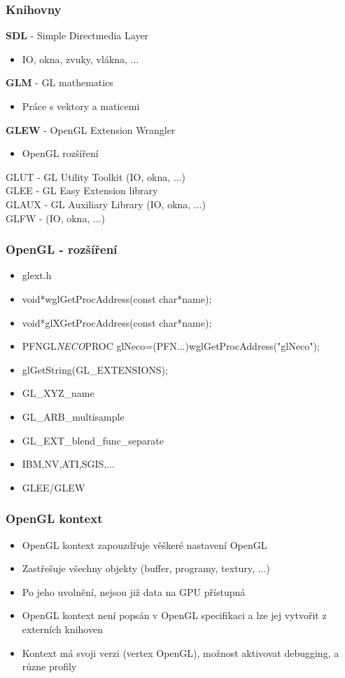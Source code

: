 

\begin{frame}
\frametitle{Knihovny}
  \textbf{SDL} - Simple Directmedia Layer
  \begin{itemize}
    \item IO, okna, zvuky, vlákna, ...
  \end{itemize}
  \textbf{GLM} - GL mathematics
  \begin{itemize}
    \item Práce s vektory a maticemi
  \end{itemize}
  \textbf{GLEW} - OpenGL Extension Wrangler
  \begin{itemize}
    \item OpenGL rozšíření
  \end{itemize}
  GLUT - GL Utility Toolkit (IO, okna, ...)\\
  GLEE - GL Easy Extension library\\
  GLAUX - GL Auxiliary Library (IO, okna, ...)\\
  GLFW - (IO, okna, ...)
\end{frame}

\begin{frame}
\frametitle{OpenGL - rozšíření}
  \begin{itemize}
    \item{glext.h}
    \item{void*wglGetProcAddress(const char*name);}
    \item{void*glXGetProcAddress(const char*name);}
    \item{PFNGL{\it NECO}PROC glNeco=(PFN...)wglGetProcAddress("glNeco");}
    \item{glGetString(GL\_EXTENSIONS);}
    \item{GL\_XYZ\_name}
    \item{GL\_ARB\_multisample}
    \item{GL\_EXT\_blend\_func\_separate}
    \item{IBM,NV,ATI,SGIS,...}
    \item{GLEE/GLEW}
  \end{itemize}
\end{frame}

\begin{frame}[fragile]
\frametitle{OpenGL kontext}
  \begin{itemize}
    \item OpenGL kontext zapouzdřuje věškeré nastavení OpenGL
    \item Zastřešuje všechny objekty (buffer, programy, textury, ...)
    \item Po jeho uvolnění, nejsou již data na GPU přístupná
    \item OpenGL kontext není popsán v OpenGL specifikaci a lze jej vytvořit z externích knihoven
    \item Kontext má svoji verzi (vertex OpenGL), možnost aktivovat debugging, a různe profily
  \end{itemize}
\end{frame}

